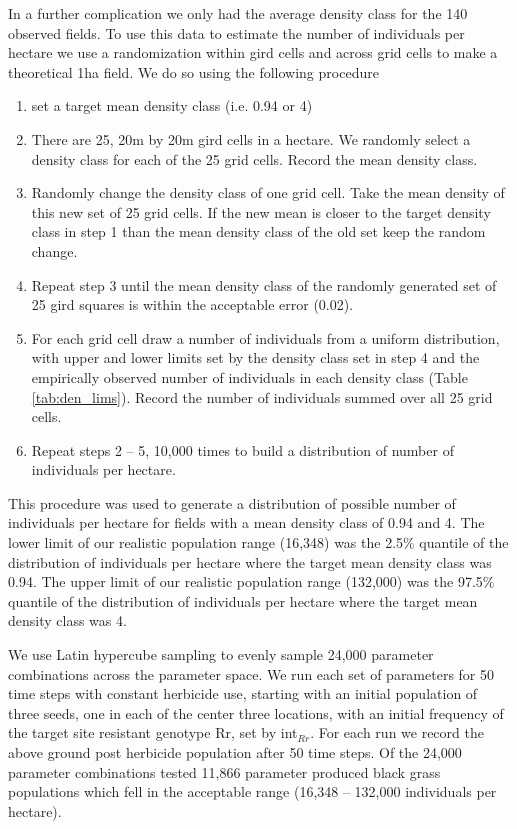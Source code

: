 \documentclass[12pt,a4paper]{article}
\begin{document}
In a further complication we only had the average density class for the 140 observed fields. To use this data to estimate the number of individuals per hectare we use a randomization within gird cells and across grid cells to make a theoretical 1ha field. We do so using the following procedure

\begin{enumerate}
	\item set a target mean density class (i.e. 0.94 or 4)
	\item There are 25, 20m by 20m gird cells in a hectare. We randomly select a density class for each of the 25 grid cells. Record the mean density class.
	\item Randomly change the density class of one grid cell. Take the mean density of this new set of 25 grid cells. If the new mean is closer to the target density class in step 1 than the mean density class of the old set  keep the random change.     
	\item Repeat step 3 until the mean density class of the randomly generated set of 25 gird squares is within the acceptable error (0.02).
	\item For each grid cell draw a number of individuals from a uniform distribution, with upper and lower limits set by the density class set in step 4 and the empirically observed number of individuals in each density class (Table \ref{tab:den_lims}). Record the number of individuals summed over all 25 grid cells.
	\item Repeat steps 2 -- 5, 10,000 times to build a distribution of number of individuals per hectare.          
\end{enumerate}

This procedure was used to generate a distribution of possible number of individuals per hectare for fields with a mean density class of 0.94 and 4. The lower limit of our realistic population range (16,348) was the 2.5\% quantile of the distribution of individuals per hectare where the target mean density class was 0.94. The upper limit of our realistic population range (132,000) was the 97.5\% quantile of the distribution of individuals per hectare where the target mean density class was 4.      

We use Latin hypercube sampling to evenly sample 24,000 parameter combinations across the parameter space. We run each set of parameters for 50 time steps with constant herbicide use, starting with an initial population of three seeds, one in each of the center three locations, with an initial frequency of the target site resistant genotype Rr, set by int$_{Rr}$. For each run we record the above ground post herbicide population after 50 time steps. Of the 24,000 parameter combinations tested 11,866 parameter produced black grass populations which fell in the acceptable range (16,348 -- 132,000 individuals per hectare).
\end{document}
